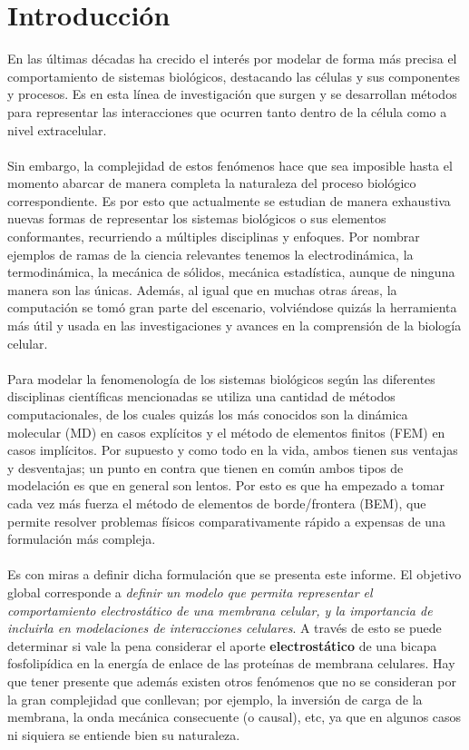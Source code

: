 \documentclass[12pt, notitlepage]{article}
\begin{document}
\section{Introducción}
En las últimas décadas ha crecido el interés por modelar de forma más precisa el comportamiento de sistemas biológicos, destacando las células y sus componentes y procesos. Es en esta línea de investigación que surgen y se desarrollan métodos para representar las interacciones que ocurren tanto dentro de la célula como a nivel extracelular.\\\\
Sin embargo, la complejidad de estos fenómenos hace que sea imposible hasta el momento abarcar de manera completa la naturaleza del proceso biológico correspondiente. Es por esto que actualmente se estudian de manera exhaustiva nuevas formas de representar los sistemas biológicos o sus elementos conformantes, recurriendo a múltiples disciplinas y enfoques. Por nombrar ejemplos de ramas de la ciencia relevantes tenemos la electrodinámica, la termodinámica, la mecánica de sólidos, mecánica estadística, aunque de ninguna manera son las únicas. Además, al igual que en muchas otras áreas, la computación se tomó gran parte del escenario, volviéndose quizás la herramienta más útil y usada en las investigaciones y avances en la comprensión de la biología celular.\\\\
Para modelar la fenomenología de los sistemas biológicos según las diferentes disciplinas científicas mencionadas se utiliza una cantidad de métodos computacionales, de los cuales quizás los más conocidos son la dinámica molecular (MD) en casos explícitos y el método de elementos finitos (FEM) en casos implícitos. Por supuesto y como todo en la vida, ambos tienen sus ventajas y desventajas; un punto en contra que tienen en común ambos tipos de modelación es que en general son lentos. Por esto es que ha empezado a tomar cada vez más fuerza el método de elementos de borde/frontera (BEM), que permite resolver problemas físicos comparativamente rápido a expensas de una formulación más compleja.\\\\
Es con miras a definir dicha formulación que se presenta este informe. El objetivo global corresponde a \textit{definir un modelo que permita representar el comportamiento electrostático de una membrana celular, y la importancia de incluirla en modelaciones de interacciones celulares}. A través de esto se puede determinar si vale la pena considerar el aporte \textbf{electrostático} de una bicapa fosfolipídica en la energía de enlace de las proteínas de membrana celulares. Hay que tener presente que además existen otros fenómenos que no se consideran por la gran complejidad que conllevan; por ejemplo, la inversión de carga de la membrana, la onda mecánica consecuente (o causal), etc, ya que en algunos casos ni siquiera se entiende bien su naturaleza.\\\\
\end{document}
